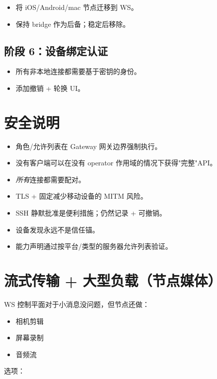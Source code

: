 \begin{itemize}
  \item 将 iOS/Android/mac 节点迁移到 WS。
  \item 保持 bridge 作为后备；稳定后移除。
\end{itemize}


\subsection{阶段 6：设备绑定认证}


\begin{itemize}
  \item 所有非本地连接都需要基于密钥的身份。
  \item 添加撤销 + 轮换 UI。
\end{itemize}


\hrulefill


\section{安全说明}


\begin{itemize}
  \item 角色/允许列表在 Gateway 网关边界强制执行。
  \item 没有客户端可以在没有 operator 作用域的情况下获得"完整"API。
  \item \textit{所有}连接都需要配对。
  \item TLS + 固定减少移动设备的 MITM 风险。
  \item SSH 静默批准是便利措施；仍然记录 + 可撤销。
  \item 设备发现永远不是信任锚。
  \item 能力声明通过按平台/类型的服务器允许列表验证。
\end{itemize}


\section{流式传输 + 大型负载（节点媒体）}


WS 控制平面对于小消息没问题，但节点还做：

\begin{itemize}
  \item 相机剪辑
  \item 屏幕录制
  \item 音频流
\end{itemize}


选项：

